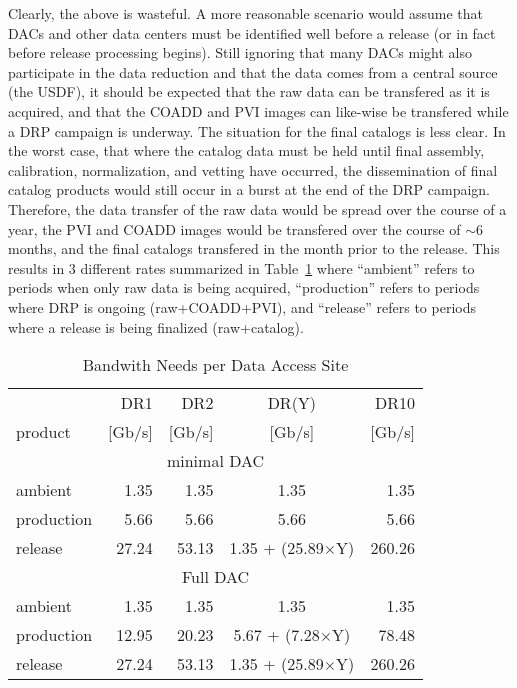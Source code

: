 Clearly, the above is wasteful.  A more reasonable scenario would assume that DACs and other data centers must be identified
well before a release (or in fact before release processing begins).  Still ignoring that many DACs might also participate 
in the data reduction and that the data comes from a central source (the USDF), it should be expected that the raw data can 
be transfered as it is acquired, and that the COADD and PVI images can like-wise be transfered while a DRP campaign is underway.
The situation for the final catalogs is less clear.  In the worst case, that where the catalog data must be held until final assembly,
calibration, normalization, and vetting have occurred, the dissemination of final catalog products would still occur in a burst at the end of the
DRP campaign.  
Therefore, the data transfer of the raw data would be spread over the course of a year, the PVI and COADD 
images would be transfered over the course of $\sim$6 months, and the final catalogs transfered in the month prior to the release.
This results in 3 different rates summarized in Table~\ref{tab_rate} where ``ambient'' refers to periods when only raw data
is being acquired, ``production'' refers to periods where DRP is ongoing (raw+COADD+PVI), and ``release'' refers to periods where 
a release is being finalized (raw+catalog).


\begin{table}[!ht]
\caption{Bandwith Needs per Data Access Site} 
\label{tab_rate}
\footnotesize
\centering
\begin{tabular}[]{|l|rrcr|}
\hline
\hline
            &   DR1   &  DR2   &  DR(Y)  &  DR10 \\
 product    &  [Gb/s] & [Gb/s] &  [Gb/s] & [Gb/s] \\
\hline
\multicolumn{5}{c}{minimal DAC} \\
\hline
 ambient    &  1.35  &  1.35  &  1.35      &  1.35  \\
 production &  5.66  &  5.66  &  5.66      &  5.66  \\
 release    & 27.24  & 53.13  &  1.35 + (25.89$\times$Y) & 260.26 \\
\hline
\multicolumn{5}{c}{Full DAC} \\
\hline
 ambient    &  1.35  &  1.35  &  1.35      &  1.35  \\
 production & 12.95  & 20.23  &  5.67 + (7.28$\times$Y) &  78.48 \\
 release    & 27.24  & 53.13  &  1.35 + (25.89$\times$Y) & 260.26 \\
\hline
\end{tabular}
\end{table}

